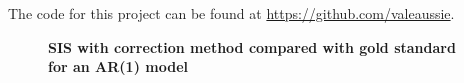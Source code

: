 \documentclass[11pt,a4paper]{article}
\begin{document}
The code for this project can be found at \url{https://github.com/valeaussie}.

\begin{figure} [h!]
    \textbf{SIS with correction method compared with gold standard for an AR(1) model }\par\medskip
    \\
    \\

\end{figure}
\end{document}
